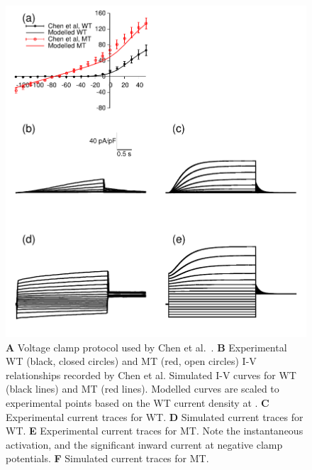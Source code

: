 \begin{figure}
\includegraphics{figures/atrium/iks/figures/01_IV}
\caption[KCNQ1 mutation in IKs, experimental data]{
\label{atrium:iks:vc}
\textbf{A} Voltage clamp protocol used by Chen et al.~\cite{Chen2003}.
\textbf{B} Experimental WT (black, closed circles) and MT (red, open circles)
I-V relationships recorded by Chen et al.  Simulated I-V curves for WT (black
lines) and MT (red lines).  Modelled curves are scaled to experimental points
based on the WT current density at .
\textbf{C} Experimental current traces for WT.
\textbf{D} Simulated current traces for WT.
\textbf{E} Experimental current traces for MT.  Note the instantaneous
activation, and the significant inward current at negative clamp potentials.
\textbf{F} Simulated current traces for MT.
}
\end{figure}

